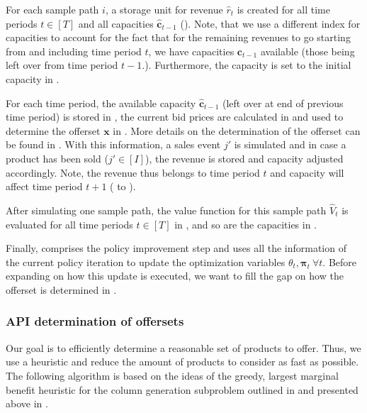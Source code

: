 For each sample path $i$, a storage unit for revenue $\hat{r}_t$ is created for all time periods $t \in [T]$ and all capacities $\boldsymbol{\hat{c}}_{t-1}$ (). Note, that we use a different index for capacities to account for the fact that for the remaining revenues to go starting from and including time period $t$, we have capacities $\boldsymbol{c}_{t-1}$ available (those being left over from time period $t-1$.). Furthermore, the capacity is set to the initial capacity in .

For each time period, the available capacity $\boldsymbol{\hat{c}}_{t-1}$ (left over at end of previous time period) is stored in , the current bid prices are calculated in  and used to determine the offerset $\boldsymbol{x}$ in . More details on the determination of the offerset can be found in . With this information, a sales event $j'$ is simulated and in case a product has been sold ($j' \in [I]$), the revenue is stored and capacity adjusted accordingly. Note, the revenue thus belongs to time period $t$ and capacity will affect time period $t+1$ ( to ).

After simulating one sample path, the value function for this sample path $\hat{V}_t$ is evaluated for all time periods $t\in[T]$ in , and so are the capacities in .

Finally,  comprises the policy improvement step and uses all the information of the current policy iteration to update the optimization variables $\theta_t, \boldsymbol{\pi}_t ~\forall t$. Before expanding on how this update is executed, we want to fill the gap on how the offerset is determined in .

\subsubsection{API determination of offersets}\label{sec-determineOfferset}

Our goal is to efficiently determine a reasonable set of products to offer. Thus, we use a heuristic and reduce the amount of products to consider as fast as possible. The following algorithm is based on the ideas of the greedy, largest marginal benefit heuristic for the column generation subproblem outlined in \cite{Bront.2009} and presented above in .

